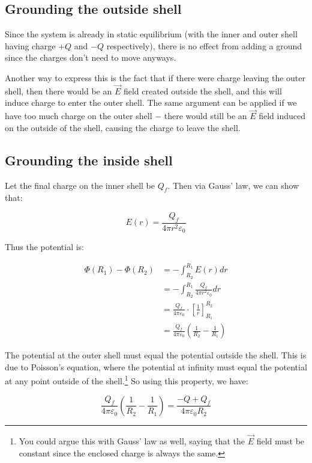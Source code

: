 \documentclass{article}
\theoremstyle{definition}
\numberwithin{equation}{section}
\numberwithin{definition}{section}
\begin{document}
    \subsection{Grounding the outside shell}

    Since the system is already in static equilibrium (with the inner and outer shell having charge $+Q$ and $-Q$ respectively), there is no effect from adding a ground since the charges don't need to move anyways. 

    Another way to express this is the fact that if there were charge leaving the outer shell, then there would be an $\vec{E}$ field created outside the shell, and this will induce charge to enter the outer shell. The same argument can be applied if we have too much charge on the outer shell $-$ there would still be an $\vec{E}$ field induced on the outside of the shell, causing the charge to leave the shell.

    \subsection{Grounding the inside shell}

    Let the final charge on the inner shell be $Q_{f}$. Then via Gauss' law, we can show that: 

    \[ E(r) = \frac{Q_f}{4\pi r^2\varepsilon_0}\]

    Thus the potential is:
     
    \begin{align*}
        \Phi (R_1) - \Phi(R_2) &= -\int_{R_2}^{R_1} E(r) dr\\
        &= -\int_{R_2}^{R_1} \frac{Q_f}{4\pi r^2 \varepsilon_0} dr\\
        &= \frac{Q_f}{4\pi \varepsilon_0} \cdot \left[\frac{1}{r}\right]_{R_1}^{R_2}\\
        &= \frac{Q_f}{4\pi \varepsilon_0}\left(\frac{1}{R_2} - \frac{1}{R_1}\right)
    \end{align*}

    The potential at the outer shell must equal the potential outside the shell. This is due to Poisson's equation, where the potential at infinity must equal the potential at any point outside of the shell.\footnote{You could argue this with Gauss' law as well, saying that the $\vec{E}$ field must be constant since the enclosed charge is always the same.} So using this property, we have:

    \[ \frac{Q_f}{4\pi \varepsilon_0}\left(\frac{1}{R_2} - \frac{1}{R_1}\right) = \frac{-Q + Q_f}{4\pi \varepsilon_0 R_2}\]
\end{document}
